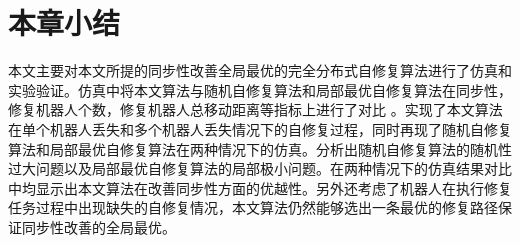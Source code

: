 \begin{comment}
若采用本文算法，则自修复过程如图\ref{fig:global_experiment_process}所示，在5号机器人丢失后，根据竞选机制，3号机器人会竞选成功，成为第一步的修复机器人，填补5号机器人的空缺位置，5号机器人会在邻居中选取下一步的修复机器人并将修复状态传递给它。根据修复机器人选取规则，1号机器人会被选为下一步的修复机器人，填补3号机器人的空缺。1号机器人是全局度最小机器人，因此修复状态传递结束。修复完成后的编队如图\ref{fig:global_experiment_process}(d)。
\begin{figure*}[!htbp]
	\centering
	\begin{tabular}{cc}
		\subfigure[]{\texttt{[image: chapter5/figure5-15aaa.png]}} & 
		\subfigure[]{\texttt{[image: chapter5/figure5-15bbb.png]}} \\
		\subfigure[]{\texttt{[image: chapter5/figure5-15ccc.png]}} &
		\subfigure[]{\texttt{[image: chapter5/figure5-15ddd.png]}}
	\end{tabular}
	\bicaption[fig:real_experiment]{真实实验中多机器人编队的同步性改善全局最优自修复过程}{真实实验中多机器人编队的同步性改善全局最优自修复过程}{Fig}{The process of global optimal synchroniation improvement self-healing in real experiment.}
\end{figure*}
图\ref{fig:real_experiment}展示了真实实验场景及过程，图中左半部分是实际Frontier \uppercase\expandafter{\romannumeral3}型自主移动机器人组成的编队队形，右半部分是在Vicon运动捕捉系统上观测到的编队图像。实验中人为取走编队中的机器人使其失效，编队能够自主的完成预期的修复效果，多次实验均能保证修复效果，证明本文算法的实际可行性和稳定性。
\end{comment}

\section{本章小结}
本文主要对本文所提的同步性改善全局最优的完全分布式自修复算法进行了仿真和实验验证。仿真中将本文算法与随机自修复算法和局部最优自修复算法在同步性，修复机器人个数，修复机器人总移动距离等指标上进行了对比
。实现了本文算法在单个机器人丢失和多个机器人丢失情况下的自修复过程，同时再现了随机自修复算法和局部最优自修复算法在两种情况下的仿真。分析出随机自修复算法的随机性过大问题以及局部最优自修复算法的局部极小问题。在两种情况下的仿真结果对比中均显示出本文算法在改善同步性方面的优越性。另外还考虑了机器人在执行修复任务过程中出现缺失的自修复情况，本文算法仍然能够选出一条最优的修复路径保证同步性改善的全局最优。

